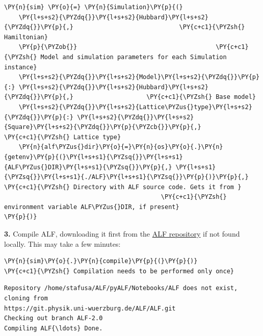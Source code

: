     \begin{tcolorbox}[breakable, size=fbox, boxrule=1pt, pad at break*=1mm,colback=cellbackground, colframe=cellborder]
\begin{Verbatim}[commandchars=\\\{\}]
\PY{n}{sim} \PY{o}{=} \PY{n}{Simulation}\PY{p}{(}
    \PY{l+s+s2}{\PYZdq{}}\PY{l+s+s2}{Hubbard}\PY{l+s+s2}{\PYZdq{}}\PY{p}{,}                             \PY{c+c1}{\PYZsh{} Hamiltonian}
    \PY{p}{\PYZob{}}                                      \PY{c+c1}{\PYZsh{} Model and simulation parameters for each Simulation instance}
    \PY{l+s+s2}{\PYZdq{}}\PY{l+s+s2}{Model}\PY{l+s+s2}{\PYZdq{}}\PY{p}{:} \PY{l+s+s2}{\PYZdq{}}\PY{l+s+s2}{Hubbard}\PY{l+s+s2}{\PYZdq{}}\PY{p}{,}                    \PY{c+c1}{\PYZsh{} Base model}
    \PY{l+s+s2}{\PYZdq{}}\PY{l+s+s2}{Lattice\PYZus{}type}\PY{l+s+s2}{\PYZdq{}}\PY{p}{:} \PY{l+s+s2}{\PYZdq{}}\PY{l+s+s2}{Square}\PY{l+s+s2}{\PYZdq{}}\PY{p}{\PYZcb{}}\PY{p}{,}             \PY{c+c1}{\PYZsh{} Lattice type}
    \PY{n}{alf\PYZus{}dir}\PY{o}{=}\PY{n}{os}\PY{o}{.}\PY{n}{getenv}\PY{p}{(}\PY{l+s+s1}{\PYZsq{}}\PY{l+s+s1}{ALF\PYZus{}DIR}\PY{l+s+s1}{\PYZsq{}}\PY{p}{,} \PY{l+s+s1}{\PYZsq{}}\PY{l+s+s1}{./ALF}\PY{l+s+s1}{\PYZsq{}}\PY{p}{)}\PY{p}{,} \PY{c+c1}{\PYZsh{} Directory with ALF source code. Gets it from }
                                           \PY{c+c1}{\PYZsh{} environment variable ALF\PYZus{}DIR, if present}
\PY{p}{)}
\end{Verbatim}
\end{tcolorbox}

    \textbf{3.} Compile ALF, downloading it first from the
\href{https://git.physik.uni-wuerzburg.de/ALF/ALF/-/tree/ALF-2.0}{ALF
repository} if not found locally. This may take a few minutes:

    \begin{tcolorbox}[breakable, size=fbox, boxrule=1pt, pad at break*=1mm,colback=cellbackground, colframe=cellborder]
\begin{Verbatim}[commandchars=\\\{\}]
\PY{n}{sim}\PY{o}{.}\PY{n}{compile}\PY{p}{(}\PY{p}{)}                              \PY{c+c1}{\PYZsh{} Compilation needs to be performed only once}
\end{Verbatim}
\end{tcolorbox}

    \begin{Verbatim}[commandchars=\\\{\}]
Repository /home/stafusa/ALF/pyALF/Notebooks/ALF does not exist, cloning from
https://git.physik.uni-wuerzburg.de/ALF/ALF.git
Checking out branch ALF-2.0
Compiling ALF{\ldots} Done.
    \end{Verbatim}

